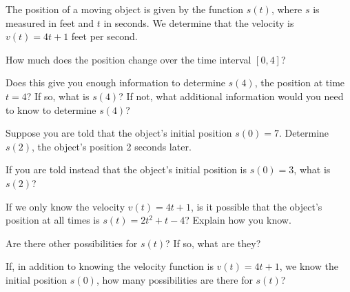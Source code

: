 \begin{pa} \label{PA:7.1}
The position of a moving object is given by the
function $s(t)$, where $s$ is measured in feet and $t$ in seconds.  We
determine that the velocity is $v(t) = 4t + 1$ feet per second.
\ba
\item How much does the position change over the time interval
  $[0,4]$?
\item Does this give you enough information to determine $s(4)$, the
  position at time $t=4$?  If so, what is $s(4)$?  If not, what
  additional information would you need to know to determine $s(4)$?
\item Suppose you are told that the object's initial position $s(0) =
  7$.  Determine $s(2)$, the object's position 2 seconds later.
\item If you are told instead that the object's initial position is
  $s(0) = 3$, what is $s(2)$?
\item If we only know the velocity $v(t)=4t+1$, is it possible that the
  object's position at all times is $s(t) = 2t^2 + t - 4$?  Explain how
  you know.
\item Are there other possibilities for $s(t)$?  If so, what are they?  
\item If, in addition to knowing the velocity function is $v(t) = 4t+1$, we know the initial position $s(0)$, how many possibilities
  are there for $s(t)$?
\ea
\end{pa} 
\afterpa
